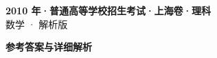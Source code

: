 \documentclass[zihao=-4, a4paper]{ctexart}
\begin{document}
\begin{center}
  {\Large\bfseries 2010 年·普通高等学校招生考试·上海卷·理科}\\[4pt]
  {\large 数学 · 解析版}
\end{center}
\medskip
{}

\clearpage
{}
\begin{center}{\Large\bfseries 参考答案与详细解析}\end{center}
\medskip

\end{document}
